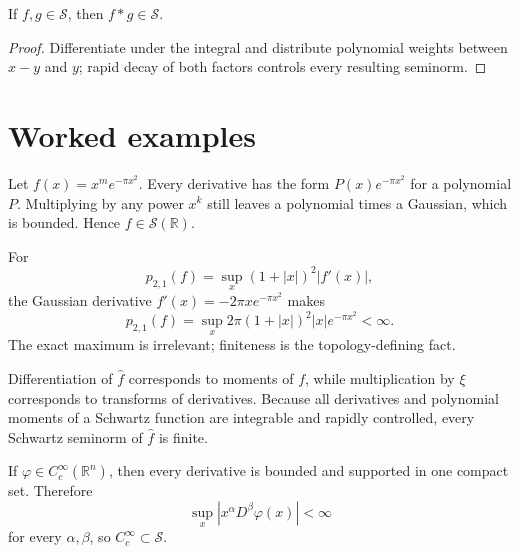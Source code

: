 \begin{theorem}\label{thm:iii14-03}
If $f,g\in\mathcal S$, then $f*g\in\mathcal S$.
\begin{proof}
Differentiate under the integral and distribute polynomial weights between $x-y$ and $y$; rapid decay of both factors controls every resulting seminorm.
\end{proof}
\end{theorem}

\section{Worked examples}

\begin{example}\label{ex:iii14-worked-01}
Let \(f(x)=x^me^{-\pi x^2}\). Every derivative has the form
\(P(x)e^{-\pi x^2}\) for a polynomial \(P\). Multiplying by any power \(x^k\)
still leaves a polynomial times a Gaussian, which is bounded. Hence
\(f\in\mathcal S(\mathbb R)\).
\end{example}

\begin{example}\label{ex:iii14-worked-02}
For
\[
p_{2,1}(f)=\sup_x(1+|x|)^2|f'(x)|,
\]
the Gaussian derivative \(f'(x)=-2\pi xe^{-\pi x^2}\) makes
\[
p_{2,1}(f)=\sup_x 2\pi(1+|x|)^2|x|e^{-\pi x^2}<\infty.
\]
The exact maximum is irrelevant; finiteness is the topology-defining fact.
\end{example}

\begin{example}\label{ex:iii14-worked-03}
Differentiation of \(\widehat f\) corresponds to moments of \(f\), while
multiplication by \(\xi\) corresponds to transforms of derivatives. Because
all derivatives and polynomial moments of a Schwartz function are integrable
and rapidly controlled, every Schwartz seminorm of \(\widehat f\) is finite.
\end{example}

\begin{example}\label{ex:iii14-worked-04}
If \(\varphi\in C_c^\infty(\mathbb R^n)\), then every derivative is
bounded and supported in one compact set. Therefore
\[
\sup_x |x^\alpha D^\beta\varphi(x)|<\infty
\]
for every \(\alpha,\beta\), so \(C_c^\infty\subset\mathcal S\).
\end{example}


